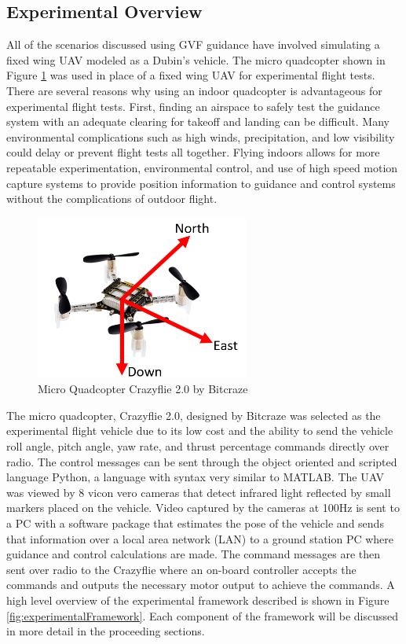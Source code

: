 \documentclass[numbered,pdftex]{ohio-etd}
\begin{document}
\subsection{Experimental Overview}
All of the scenarios discussed using GVF guidance have involved simulating a fixed wing UAV modeled as a Dubin's vehicle. The micro quadcopter shown in Figure \ref{fig:crazyflie2} was used in place of a fixed wing UAV for experimental flight tests. There are several reasons why using an indoor quadcopter is advantageous for experimental flight tests. First, finding an airspace to safely test the guidance system with an adequate clearing for takeoff and landing can be difficult. Many environmental complications such as high winds, precipitation, and low visibility could delay or prevent flight tests all together.  Flying indoors allows for more repeatable experimentation, environmental control, and use of high speed motion capture systems to provide position information to guidance and control systems without the complications of outdoor flight. 



\begin{figure}
	\centering
	\includegraphics[trim=0 0 0 0,clip,width=7cm]{PaperFigures/methods/crazyflieNED}
	\caption{Micro Quadcopter Crazyflie 2.0 by Bitcraze}
	\label{fig:crazyflie2}
\end{figure}


The micro quadcopter, Crazyflie 2.0, designed by Bitcraze was selected as the experimental flight vehicle due to its low cost and the ability to send the vehicle roll angle, pitch angle, yaw rate, and thrust percentage commands directly over radio. The control messages can be sent through the object oriented and scripted language Python, a language with syntax very similar to MATLAB. The UAV was viewed by 8 vicon vero cameras that detect infrared light reflected by small markers placed on the vehicle. Video captured by the cameras at 100Hz is sent to a PC with a software package that estimates the pose of the vehicle and sends that information over a local area network (LAN) to a ground station PC where guidance and control calculations are made. The command messages are then sent over radio to the Crazyflie where an on-board controller accepts the commands and outputs the necessary motor output to achieve the commands. A high level overview of the experimental framework described is shown in Figure \ref{fig:experimentalFramework}. Each component of the framework will be discussed in more detail in the proceeding sections. 
\end{document}
